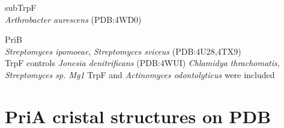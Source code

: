 \documentclass[12pt,twoside]{reedthesis}
\begin{document}
  subTrpF\\
  \emph{Arthrobacter aurescens} (PDB:4WD0)
  
  PriB\\
  \emph{Streptomyces ipomoeae}, \emph{Streptomyces sviceus}
  (PDB:4U28,4TX9)\\
  TrpF controls \emph{Jonesia denitrificans} (PDB:4WUI) \emph{Chlamidya
  thrachomatis}, \emph{Streptomyces sp. Mg1} TrpF and \emph{Actinomyces
  odontolyticus} were included
  
  \clearpage  
  
  \section{PriA cristal structures on
  PDB}\label{pria-cristal-structures-on-pdb}
  
  \begin{Shaded}
  \begin{Highlighting}[]
  \StringTok{ }\NormalTok{(}\NormalTok{, } \NormalTok{,}\NormalTok{)}
   \CharTok{\textbackslash{}\textbackslash{}}\NormalTok{,} \NormalTok{)}
  \end{Highlighting}
  \end{Shaded}
  
\end{document}
